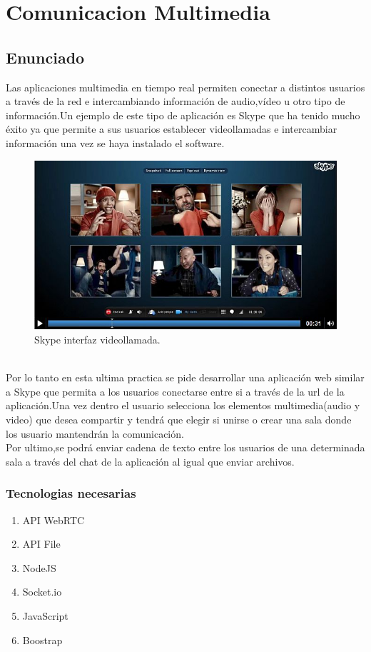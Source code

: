 \chapter{Comunicacion Multimedia}

\section{Enunciado}
Las aplicaciones multimedia en tiempo real permiten conectar a distintos usuarios a través de la red e intercambiando información de audio,vídeo u otro tipo de información.Un ejemplo de este tipo de aplicación es Skype que ha tenido mucho éxito ya que permite a sus usuarios establecer videollamadas e intercambiar información una vez se haya instalado el software.
\begin{figure}[!h]
\begin{center}
   \includegraphics[width=0.9\linewidth]{Figures/skype}
	\decoRule
	\caption[Ejemplo sitio Web]{Skype interfaz videollamada.}
\label{fig:canvasPrimitivas}
\end{center}
\end{figure}
\\Por lo tanto en esta ultima practica se pide desarrollar una aplicación web similar a Skype que permita a los usuarios conectarse entre si a través de la url de la aplicación.Una vez dentro el usuario selecciona los elementos multimedia(audio y video) que desea compartir y tendrá que elegir si unirse o crear una sala donde los usuario mantendrán la comunicación.
\\Por ultimo,se podrá enviar cadena de texto entre los usuarios de una determinada sala a través del chat de la aplicación al igual que enviar archivos.

\subsection{Tecnologias necesarias}
\begin{enumerate}
\item API WebRTC
\item API File
\item NodeJS
\item Socket.io
\item JavaScript
\item Boostrap
\end{enumerate}

